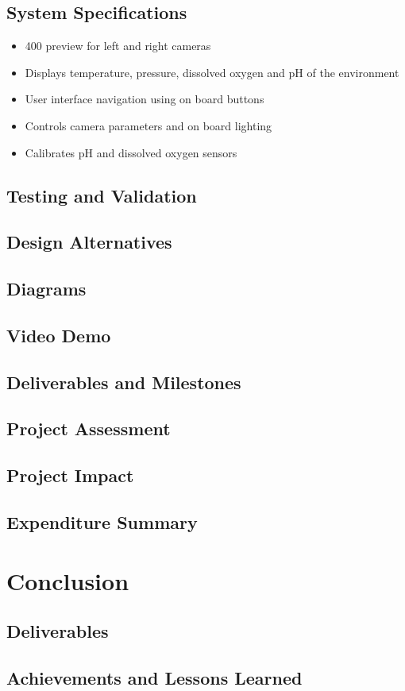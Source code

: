 \documentclass[17pt, aspectratio=169]{beamer}
\begin{document}
\subsection*{System Specifications}
\begin{itemize}
	\item 400 preview for left and right cameras
	\item Displays temperature, pressure, dissolved oxygen and pH of the environment
	\item User interface navigation using on board buttons
	\item Controls camera parameters and on board lighting
	\item Calibrates pH and dissolved oxygen sensors
\end{itemize}
\subsection*{Testing and Validation}
\subsection*{Design Alternatives}
\subsection*{Diagrams}
\subsection{Video Demo}
\subsection*{Deliverables and Milestones}
\subsection{Project Assessment}
\subsection*{Project Impact}
\subsection*{Expenditure Summary}
\section{Conclusion}
\subsection{Deliverables}
\subsection{Achievements and Lessons Learned}
\end{document}
